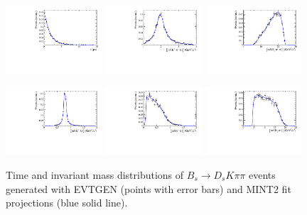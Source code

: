 \begin{figure}[h]
	\centering
		\includegraphics[width=0.32\textwidth, height = !]{figs/fullFit/signal_DsKpipi_CPV_MC/h_t.pdf} 
		\includegraphics[width=0.32\textwidth, height = !]{figs/fullFit/signal_DsKpipi_CPV_MC/s_Kpipi.pdf} 
		\includegraphics[width=0.32\textwidth, height = !]{figs/fullFit/signal_DsKpipi_CPV_MC/s_Dspipi.pdf} 

		\includegraphics[width=0.32\textwidth, height = !]{figs/fullFit/signal_DsKpipi_CPV_MC/s_Kpi.pdf} 
		\includegraphics[width=0.32\textwidth, height = !]{figs/fullFit/signal_DsKpipi_CPV_MC/s_pipi.pdf} 
		\includegraphics[width=0.32\textwidth, height = !]{figs/fullFit/signal_DsKpipi_CPV_MC/s_Dspi.pdf} 
		
		\caption{Time and invariant mass distributions of $B_s \to D_s K \pi\pi$ events generated with \textsf{EVTGEN} (points with error bars) and \textsf{MINT2} fit projections (blue solid line).} 		
		\label{fig:FitGenMC2}	
\end{figure}	


